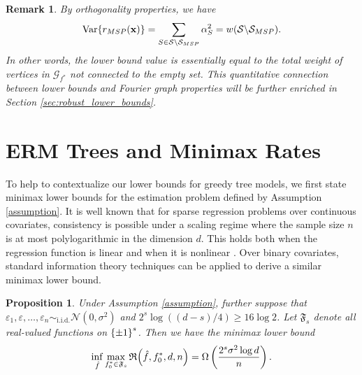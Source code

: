 \documentclass[11pt]{article}
\newtheorem{proposition}[theorem]{Proposition}
\newtheorem{remark}[theorem]{Remark}
\newcommand{\bx}{\mathbf{x}}
\DeclarePairedDelimiter{\braces}{\lbrace}{\rbrace}
\DeclarePairedDelimiter{\paren}{(}{)}
\newcommand{\Var}{\operatorname{Var}}
\newcommand{\sparsity}{s}
\newcommand{\nfeats}{d}
\newcommand{\nsamples}{n}
\newcommand{\funcclass}{\mathfrak{F}}
\newcommand{\jk}[1]{{\color{orange}[JK: #1]}}
\newcommand{\MSP}{\textsf{MSP}}
\newcommand{\fcoefs}{\mathcal{S}}
\newcommand{\objective}{\mathfrak{R}}
\newcommand{\sparsefuncs}{\funcclass_\sparsity}
\begin{document}
\begin{remark}
    By orthogonality properties, we have
    \begin{equation}
        \Var\braces*{r_{\MSP}(\bx)} = \sum_{S \in \fcoefs\backslash\fcoefs_{\MSP}} \alpha_S^2 = w(\fcoefs\backslash\fcoefs_{\MSP}).
    \end{equation}
    In other words, the lower bound value is essentially equal to the total weight of vertices in $\mathcal{G}_{f^*}$ not connected to the empty set.
    This quantitative connection between lower bounds and Fourier graph properties will be further enriched in Section \ref{sec:robust_lower_bounds}.
\end{remark}

\section{ERM Trees and Minimax Rates} 
\label{sec:erm}

To help to contextualize our lower bounds for greedy tree models, we first state minimax lower bounds for the estimation problem defined by Assumption \ref{assumption}.
It is well known that for sparse regression problems over continuous covariates, consistency is possible under a scaling regime where the sample size $\nsamples$ is at most polylogarithmic in the dimension $\nfeats$.
This holds both when the regression function is linear \citep{wainwright2019high} and when it is nonlinear \citep{wasserman2005rodeo}.
Over binary covariates, standard information theory techniques can be applied to derive a similar minimax lower bound. 


\begin{proposition}
\label{prop:info_theory_lower_bound}
    Under Assumption \ref{assumption}, further suppose that $\varepsilon_1,\varepsilon,\ldots,\varepsilon_\nsamples \sim_{\text{i.i.d.}} \mathcal{N}(0,\sigma^2)$ and $2^s\log((d-s)/4) \geq 16\log 2$.
    Let $\sparsefuncs$ denote all real-valued functions on $\braces*{\pm 1}^\sparsity$.
    Then we have the minimax lower bound
    \begin{equation}
        \inf_{\hat f}\max_{f_0^* \in \sparsefuncs} \objective\paren*{\hat f, f^*_0,\nfeats,\nsamples} = \Omega\left( \frac{2^s \sigma^2\log d}{n}\right).
    \end{equation}
\end{proposition}
\end{document}
